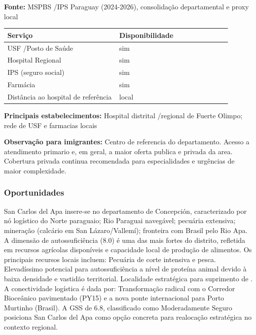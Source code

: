 \textbf{Fonte:} MSPBS /\allowbreak \allowbreak  IPS Paraguay (2024-2026), consolidação
departamental e proxy local

{\def\LTcaptype{none} %
\begin{longtable}{@{}>{\raggedright\arraybackslash}p{0.45\linewidth} >{\raggedright\arraybackslash}p{0.45\linewidth}@{}}
\toprule\noalign{}
Serviço & Disponibilidade \\
\midrule\noalign{}
\endhead
\bottomrule\noalign{}
\endlastfoot
USF /\allowbreak \allowbreak  Posto de Saúde & sim \\
Hospital Regional & sim \\
IPS (seguro social) & sim \\
Farmácia & sim \\
Distância ao hospital de referência & local \\
\end{longtable}
}

\textbf{Principais estabelecimentos:} Hospital distrital /\allowbreak \allowbreak  regional de
Fuerte Olimpo; rede de USF e farmacias locais

\textbf{Observação para imigrantes:} Centro de referencia do
departamento. Acesso a atendimento primario e, em geral, a maior oferta
publica e privada da area. Cobertura privada continua recomendada para
especialidades e urgências de maior complexidade.
\newpage

\subsubsection*{Oportunidades}\label{oport-san-carlos-del-apa-0105}
San Carlos del Apa insere-se no departamento de Concepción, caracterizado por nó logístico do Norte paraguaio; Rio Paraguai navegável; pecuária extensiva; mineração (calcário em San Lázaro/Vallemí); fronteira com Brasil pelo Rio Apa. A dimensão de autossuficiência (8.0) é uma das mais fortes do distrito, refletida em recursos agrícolas disponíveis e capacidade local de produção de alimentos. Os principais recursos locais incluem: Pecuária de corte intensiva e pesca. Elevadíssimo potencial para autossuficiência a nível de proteína animal devido à baixa densidade e vastidão territorial. Localidade estratégica para suprimento de . A conectividade logística é dada por: Transformação radical com o Corredor Bioceânico pavimentado (PY15) e a nova ponte internacional para Porto Murtinho (Brasil). A GSS de 6.8, classificado como Moderadamente Seguro posiciona San Carlos del Apa como opção concreta para realocação estratégica no contexto regional.

